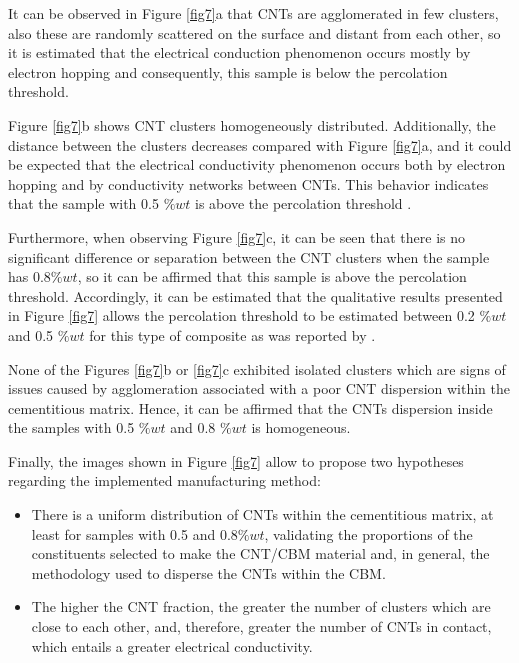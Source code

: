 \documentclass[twocolumn]{bmcart}%
\begin{document}
It can be observed in Figure \ref{fig7}a that CNTs are agglomerated in few clusters, also these are randomly scattered on the surface and distant from each other, so it is estimated that the electrical conduction phenomenon occurs mostly by electron hopping \cite{Balberg1984, Garcia-Macias2017} and consequently, this sample is below the percolation threshold.

Figure \ref{fig7}b shows CNT clusters homogeneously distributed. Additionally, the distance between the clusters decreases compared with Figure \ref{fig7}a, and it could be expected that the electrical conductivity phenomenon occurs both by electron hopping and by conductivity networks between CNTs. This behavior indicates that the sample with 0.5 $\%wt$ is above the percolation threshold \cite{Balberg1984, Garcia-Macias2017}.

Furthermore, when observing Figure \ref{fig7}c, it can be seen that there is no significant difference or separation between the CNT clusters when the sample has 0.8$\%wt$, so it can be affirmed that this sample is above the percolation threshold. Accordingly, it can be estimated that the qualitative results presented in Figure \ref{fig7} allows the percolation threshold to be estimated between 0.2 $\%wt$ and 0.5 $\%wt$ for this type of composite as was reported by \cite{Souri2017, Garcia-Macias2017, Hoseini2017}. 

None of the Figures \ref{fig7}b or \ref{fig7}c exhibited isolated clusters which are signs of issues caused by agglomeration associated with a poor CNT dispersion within the cementitious matrix. Hence, it can be affirmed that the CNTs dispersion inside the samples with 0.5 $\%wt$ and 0.8 $\%wt$ is homogeneous. 

Finally, the images shown in Figure \ref{fig7} allow to propose two hypotheses regarding the implemented manufacturing method:

\begin{itemize}
    

\item  There is a uniform distribution of CNTs within the cementitious matrix, at least for samples with 0.5  and 0.8$\%wt$, validating the proportions of the constituents selected to make the CNT/CBM material and, in general, the methodology used to disperse the CNTs within the CBM.
\item 	The higher the CNT fraction, the greater the number of clusters which are close to each other, and, therefore, greater the number of CNTs in contact, which entails a greater electrical conductivity.

\end{itemize}
\end{document}
